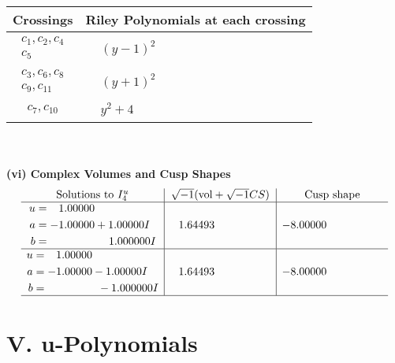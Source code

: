 \documentclass[1p]{elsarticle_modified}
\theoremstyle{definition}
\newcommand{\I}{\sqrt{-1}}
\begin{document}
\begin{tabular}{m{50pt}|m{274pt}}
Crossings & \hspace{64pt}Riley Polynomials at each crossing \\
\hline $$\begin{aligned}c_{1},c_{2},c_{4}\\c_{5}\end{aligned}$$&$\begin{aligned}
&(y-1)^2
\end{aligned}$\\
\hline $$\begin{aligned}c_{3},c_{6},c_{8}\\c_{9},c_{11}\end{aligned}$$&$\begin{aligned}
&(y+1)^2
\end{aligned}$\\
\hline $$\begin{aligned}c_{7},c_{10}\end{aligned}$$&$\begin{aligned}
&y^2+4
\end{aligned}$\\
\hline
\end{tabular}\\~\\
\newpage\flushleft \textbf{(vi) Complex Volumes and Cusp Shapes}
$$\begin{array}{c|c|c}  
\text{Solutions to }I^u_{4}& \I (\text{vol} + \sqrt{-1}CS) & \text{Cusp shape}\\
 \hline 
\begin{aligned}
u &= \phantom{-}1.00000\phantom{ +0.000000I} \\
a &= -1.00000 + 1.00000 I \\
b &= \phantom{-0.000000 -}1.000000 I\end{aligned}
 & \phantom{-}1.64493\phantom{ +0.000000I} & -8.00000\phantom{ +0.000000I} \\ \hline\begin{aligned}
u &= \phantom{-}1.00000\phantom{ +0.000000I} \\
a &= -1.00000 - 1.00000 I \\
b &= \phantom{-0.000000 } -1.000000 I\end{aligned}
 & \phantom{-}1.64493\phantom{ +0.000000I} & -8.00000\phantom{ +0.000000I}\\
 \hline 
 \end{array}$$\newpage
\newpage\renewcommand{\arraystretch}{1}
\centering \section*{ V. u-Polynomials}
\end{document}
